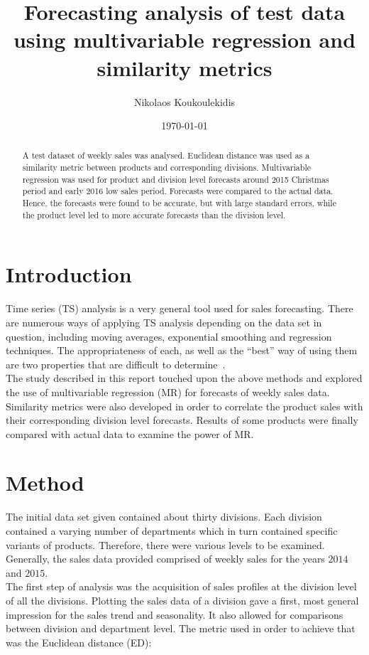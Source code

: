 \documentclass[11pt]{article}
\title{Forecasting analysis of test data using multivariable regression and similarity metrics}
\author{Nikolaos Koukoulekidis}
\date{\today}
\begin{document}
\maketitle


\begin{abstract}
A test dataset of weekly sales was analysed. Euclidean distance was used as a similarity metric between products and corresponding divisions. Multivariable regression was used for product and division level forecasts around 2015 Christmas period and early 2016 low sales period. Forecasts were compared to the actual data. Hence, the forecasts were found to be accurate, but with large standard errors, while the product level led to more accurate forecasts than the division level.
\end{abstract}


\section{Introduction}
Time series (TS) analysis is a very general tool used for sales forecasting. There are numerous ways of applying TS analysis depending on the data set in question, including moving averages, exponential smoothing and regression techniques. The appropriateness of each, as well as the ``best'' way of using them are two properties that are difficult to determine~\cite{Keogh}.\\

The study described in this report touched upon the above methods and explored the use of multivariable regression (MR) for forecasts of weekly sales data. Similarity metrics were also developed in order to correlate the product sales with their corresponding division level forecasts. Results of some products were finally compared with actual data to examine the power of MR.

\section{Method}

The initial data set given contained about thirty divisions. Each division contained a varying number of departments which in turn contained specific variants of products. Therefore, there were various levels to be examined. Generally, the sales data provided comprised of weekly sales for the years $2014$ and $2015$.\\

The first step of analysis was the acquisition of sales profiles at the division level of all the divisions. Plotting the sales data of a division gave a first, most general impression for the sales trend and seasonality. It also allowed for comparisons between division and department level. The metric used in order to achieve that was the Euclidean distance (ED):
\end{document}
